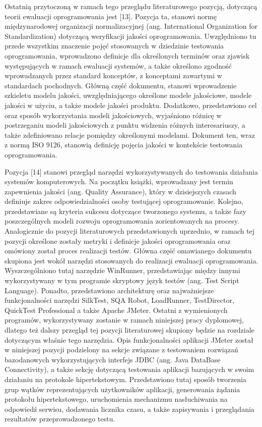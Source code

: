 Ostatnią przytoczoną w ramach tego przeglądu literaturowego pozycją, dotyczącą teorii ewaluacji oprogramowania jest [13]. Pozycja ta, stanowi normę międzynarodowej organizacji normalizacyjnej (ang. International Organization for Standardization) dotyczącą weryfikacji jakości oprogramowania. Uwzględniono tu przede wszystkim znaczenie pojęć stosowanych w dziedzinie testowania oprogramowania, wprowadzono definicje dla określonych terminów oraz zjawisk występujących w ramach ewaluacji systemów, a także określono zgodność wprowadzanych przez standard konceptów, z konceptami zawartymi w standardach pochodnych. Główną część dokumentu, stanowi wprowadzenie szkieletu modelu jakości, uwzględniającego określone modele jakościowe, modele jakości w użyciu, a także modele jakości produktu. Dodatkowo, przedstawiono cel oraz sposób wykorzystania modeli jakościowych, wyjaśniono różnicę w postrzeganiu modeli jakościowych z punktu widzenia różnych interesariuszy, a także zdefiniowano relacje pomiędzy określonymi modelami. Dokument ten, wraz z normą ISO 9126, stanowią definicję pojęcia jakości w kontekście testowania oprogramowania.

Pozycja [14] stanowi przegląd narzędzi wykorzystywanych do testowania działania systemów komputerowych. Na początku książki, wprowadzany jest termin zapewnienia jakości (ang. Quality Assurance), który w dzisiejszych czasach definiuje zakres odpowiedzialności osoby testującej oprogramowanie. Kolejno, przedstawiane są kryteria sukcesu dotyczące tworzonego systemu, a także fazy poszczególnych modeli rozwoju oprogramowania zorientowanych na procesy. Analogicznie do pozycji literaturowych przedstawionych uprzednio, w ramach tej pozycji określone zostały metryki i definicje jakości oprogramowania oraz omówiony został proces realizacji testów. Główna część omawianego dokumentu skupiona jest wokół narzędzi stosowanych do realizacji ewaluacji oprogramowania. Wyszczególniono tutaj narzędzie WinRunner, przedstawiając między innymi wykorzystywany w tym programie skryptowy język testów (ang. Test Script Language). Ponadto, przedstawiono architekturę oraz najważniejsze funkcjonalności narzędzi SilkTest, SQA Robot, LoadRunner, TestDirector, QuickTest Professional a także Apache JMeter. Ostatni z wymienionych programów, wykorzystywany zostanie w ramach niniejszej pracy dyplomowej, dlatego też dalszy przegląd tej pozycji literaturowej skupiony będzie na rozdziale dotyczącym właśnie tego narzędzia. Opis funkcjonalności aplikacji JMeter został w niniejszej pozycji podzielony na sekcje związane z testowaniem rozwiązań bazodanowych wykorzystujących interfejs JDBC (ang. Java DataBase Connectivity), a także sekcję dotyczącą testowania aplikacji bazujących w swoim działaniu na protokole hipertekstowym. Przedstawiono tutaj sposób tworzenia grup wątków reprezentujących użytkowników aplikacji, generowania żądania protokołu hipertekstowego, uruchomienia mechanizmu nasłuchiwania na odpowiedź serwisu, dodawania licznika czasu, a także zapisywania i przeglądania rezultatów przeprowadzonego testu.

